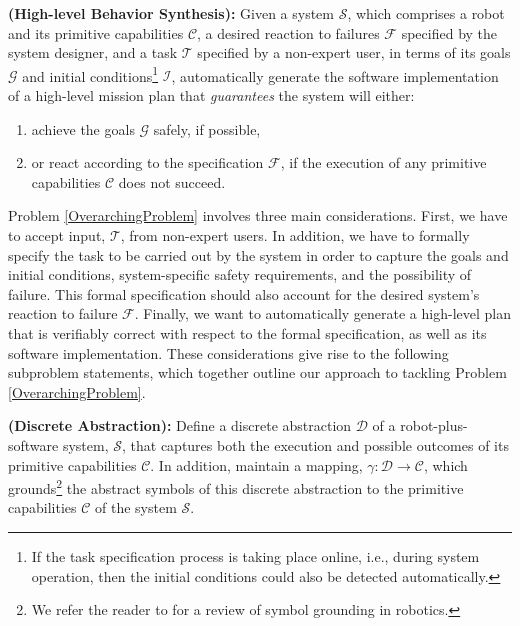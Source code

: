 
\begin{myProblem}\label{OverarchingProblem}
\textbf{(High-level Behavior Synthesis):}
	Given a system $\mathcal{S}$, which comprises a robot and its primitive capabilities $\mathcal{C}$, a desired reaction to failures $\mathcal{F}$ specified by the system designer, and a task $\mathcal{T}$ specified by a non-expert user, in terms of its goals $\mathcal{G}$ and initial conditions\footnote{If the task specification process is taking place online, i.e., during system operation, then the initial conditions could also be detected automatically.}
	 $\mathcal{I}$, automatically generate the software implementation of a high-level mission plan that \emph{guarantees} the system will either:
	\begin{enumerate}[i]
		\item achieve the goals $\mathcal{G}$ safely, if possible,
		\item or react according to the specification $\mathcal{F}$, if the execution of any primitive capabilities $\mathcal{C}$ does not succeed.
	\end{enumerate}
\end{myProblem}

Problem \ref{OverarchingProblem} involves three main considerations.
First, we have to accept input, $\mathcal{T}$, from non-expert users.
In addition, we have to formally specify the task to be carried out by the system in order to capture the goals and initial conditions, system-specific safety requirements, and the possibility of failure.
This formal specification should also account for the desired system's reaction to failure $\mathcal{F}$.
Finally, we want to automatically generate a high-level plan that is verifiably correct with respect to the formal specification, as well as its software implementation.
These considerations give rise to the following subproblem statements, which together outline our approach to tackling Problem \ref{OverarchingProblem}.

\begin{myProblem}\label{DiscreteAbstractionProblem}
\textbf{(Discrete Abstraction):}
Define a discrete abstraction $\mathcal{D}$ of a robot-plus-software system, $\mathcal{S}$, that captures both the execution and possible outcomes of its primitive capabilities $\mathcal{C}$.
In addition, maintain a mapping, $\gamma: \mathcal{D} \rightarrow \mathcal{C}$, which grounds\footnote{We refer the reader to \cite{Grounding2013} for a review of symbol grounding in robotics.}
 the abstract symbols of this discrete abstraction to the primitive capabilities $\mathcal{C}$ of the system $\mathcal{S}$.
\end{myProblem}

